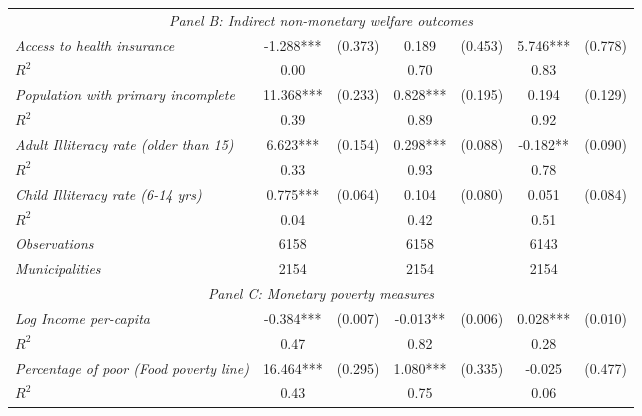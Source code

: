 \begin{tabular}{lcccccc}
\multicolumn{7}{c}{\textit{Panel B: Indirect non-monetary welfare outcomes}} \\
		
\textit{Access to health insurance}          &  -1.288***    & (0.373)      &   0.189        &  (0.453)      &     5.746***  &    (0.778)   \\
$R^{2}$			           	   &  0.00   & 	   &     0.70   	&		 &     0.83   &  \\

\textit{Population with primary incomplete}          &  11.368***    & (0.233)      &   0.828***        &  (0.195)      &     0.194  &    (0.129)   \\
$R^{2}$			           	   &  0.39   & 	   &     0.89   	&		 &     0.92   &  \\
		
\textit{Adult Illiteracy rate (older than 15)}          &  6.623***    & (0.154)      &   0.298***        &  (0.088)      &     -0.182**  &    (0.090)   \\
$R^{2}$			           	   &  0.33   & 	   &     0.93   	&		 &     0.78   &  \\

\textit{Child Illiteracy rate (6-14 yrs)}          &  0.775***    & (0.064)      &   0.104        &  (0.080)      &     0.051  &    (0.084)   \\
$R^{2}$			           	   &  0.04   & 	   &     0.42   	&		 &     0.51   &  \\


\textit{Observations}                 &   6158    &        & 6158    &  &  6143   &  		\\
\textit{Municipalities}               &   2154   &        & 2154   &  &  2154  &  		\\
\hline		

\multicolumn{7}{c}{\textit{Panel C: Monetary poverty measures}} \\


\textit{Log Income per-capita}          &  -0.384***    & (0.007)      &   -0.013**        &  (0.006)      &     0.028***  &    (0.010)   \\
$R^{2}$			           	   &  0.47   & 	   &     0.82   	&		 &     0.28   &  \\

\textit{Percentage of poor (Food poverty line)}          &  16.464***    & (0.295)      &   1.080***        &  (0.335)      &     -0.025  &    (0.477)   \\
$R^{2}$			           	   &  0.43   & 	   &     0.75   	&		 &     0.06   &  \\
		

\end{tabular}
